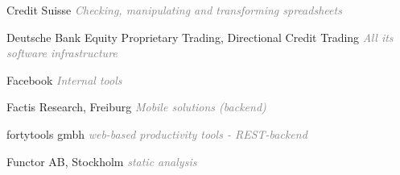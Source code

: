 \begin{frame}[fragile]{}
\begin{itemize}
{\item Credit Suisse \textcolor{gray}{\textit{Checking, manipulating and transforming spreadsheets}}
\item Deutsche Bank Equity Proprietary Trading, Directional Credit Trading \textcolor{gray}{\textit{All its software infrastructure}}
\item Facebook \textcolor{gray}{\textit{Internal tools}}
\item Factis Research, Freiburg \textcolor{gray}{\textit{Mobile solutions (backend)}}
\item fortytools gmbh \textcolor{gray}{\textit{web-based productivity tools - REST-backend}}
\item Functor AB, Stockholm \textcolor{gray}{\textit{static analysis}}
}
\end{itemize}
\end{frame}

